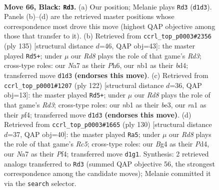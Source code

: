 \documentclass[11pt]{article}
\begin{document}
\clearpage

\begin{figure}[p]\centering
\begin{subfigure}{0.46\textwidth}\centering
\resizebox{\linewidth}{!}{%
\newchessgame
\chessboard[
  setfen={8/n1P2k1K/p7/P4p1p/4pBb1/6P1/8/RN1r4 b - - 39 66},
  showmover=false,
  pgfstyle=straightmove, color=movearrow, markmove={d1-d3}
]}
\caption{}
\end{subfigure}\hfill
\begin{subfigure}{0.46\textwidth}\centering
\resizebox{\linewidth}{!}{%
\newchessgame
\chessboard[
  setfen={8/5k2/3r3p/5K1P/p2B4/Pb3P2/1P1R4/8 b - - 0 68},
  showmover=false,
  pgfstyle=straightmove, color=movearrow, markmove={d6-d5}
]}
\caption{}
\end{subfigure}
\\[4pt]
\begin{subfigure}{0.46\textwidth}\centering
\resizebox{\linewidth}{!}{%
\newchessgame
\chessboard[
  setfen={8/4r3/8/p1p3kP/2B2p2/1P1Rb3/P5K1/8 w - - 3 62},
  showmover=false,
  pgfstyle=straightmove, color=movearrow, markmove={d3-d5}
]}
\caption{}
\end{subfigure}\hfill
\begin{subfigure}{0.46\textwidth}\centering
\resizebox{\linewidth}{!}{%
\newchessgame
\chessboard[
  setfen={2r1b3/6pk/2p1P3/2Rp1pB1/p2P1P1P/P7/3K4/8 w - - 1 66},
  showmover=false,
  pgfstyle=straightmove, color=movearrow, markmove={c5-a5}
]}
\caption{}
\end{subfigure}
\caption{\textbf{Move 66, Black: \texttt{Rd3}.} (a) Our position; Melanie plays \texttt{Rd3} (\texttt{d1d3}). Panels (b)--(d) are the retrieved master positions whose correspondence most drove this move (highest QAP objective among those that transfer to it). (b) Retrieved from \texttt{ccrl\_top\_p0003\#2356} (ply 135) [structural distance $d$=46, QAP obj=43]: the master played \texttt{Rd5+}; under $\mu$ our \emph{Rd8} plays the role of that game's \emph{Rd3}; cross-type roles: our \emph{N}a7 as their \emph{P}h6, our \emph{n}b1 as their \emph{b}d4; transferred move \texttt{d1d3} \textbf{(endorses this move)}. (c) Retrieved from \texttt{ccrl\_top\_p0001\#1207} (ply 122) [structural distance $d$=36, QAP obj=13]: the master played \texttt{Rd5+}; under $\mu$ our \emph{Rd8} plays the role of that game's \emph{Rd3}; cross-type roles: our \emph{n}b1 as their \emph{b}e3, our \emph{r}a1 as their \emph{p}f4; transferred move \texttt{d1d3} \textbf{(endorses this move)}. (d) Retrieved from \texttt{ccrl\_top\_p0003\#1665} (ply 130) [structural distance $d$=37, QAP obj=40]: the master played \texttt{Ra5}; under $\mu$ our \emph{Rd8} plays the role of that game's \emph{Rc5}; cross-type roles: our \emph{B}g4 as their \emph{P}d4, our \emph{N}a7 as their \emph{P}f4; transferred move \texttt{d1g1}. Synthesis: 2 retrieved analogs transferred to \texttt{Rd3} (summed QAP objective 56, the strongest correspondence among the candidate moves); Melanie committed it via the \texttt{search} selector.}
\label{fig:thought-m131}
\end{figure}
\end{document}
